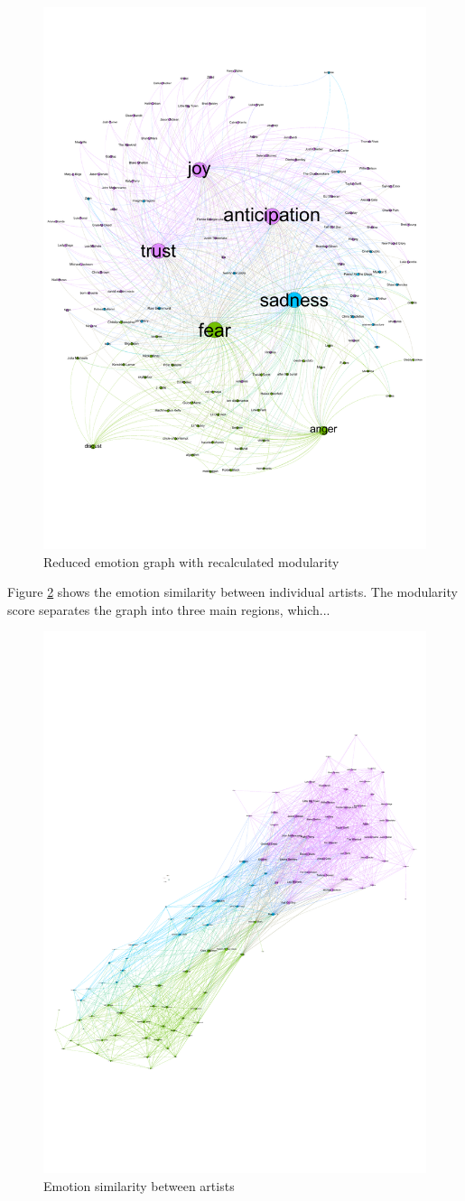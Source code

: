 \documentclass[10pt,a4paper]{article}
\begin{document}
		\begin{figure}[htb]
			\centering
			\includegraphics[trim=0mm 50mm 0mm 30mm, clip, width=0.7\linewidth]{data/emotion_graph_new_modularity}
			\caption{Reduced emotion graph with recalculated modularity}
			\label{fig:emotionnewmod}
		\end{figure}
		
		Figure \ref{fig:emotionsimilarity} shows the emotion similarity between individual artists. The modularity score separates the graph into three main regions, which...
		
		\begin{figure}[htb]
			\centering
			\includegraphics[trim=0mm 50mm 0mm 50mm, clip, width=0.7\linewidth]{data/emotion_similarity}
			\caption{Emotion similarity between artists}
			\label{fig:emotionsimilarity}
		\end{figure}
	
\end{document}
